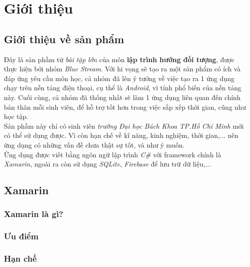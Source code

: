 \documentclass[a4paper]{article}
\begin{document}
\newpage
\tableofcontents
\newpage
\section{Giới thiệu}
\subsection{Giới thiệu về sản phẩm}
\hspace*{1 cm}Đây là sản phầm từ \textit{bài tập lớn} của môn \textbf{lập trình hướng đối tượng}, được thực hiện bởi nhóm \textit{Blue Stream}. Với hi vọng sẽ tạo ra một sản phẩm có ích và đáp ứng yêu cầu môn học, cả nhóm đã lên ý tưởng về việc tạo ra 1 ứng dụng chạy trên nền tảng điện thoại, cụ thể là \textit{Android}, vì tính phổ biến của nền tảng này. Cuối cùng, cả nhóm đã thống nhất sẽ làm 1 ứng dụng liên quan đến chính bản thân mỗi sinh viên, để hỗ trợ tốt hơn trong việc sắp xếp thời gian, cũng như học tập.\\
\hspace*{1 cm} Sản phầm này chỉ có sinh viên \textit{trường Đại học Bách Khoa TP.Hồ Chí Minh} mới có thể sử dụng được. Vì còn hạn chế về kĩ năng, kinh nghiệm, thời gian,... nên ứng dụng có những vấn đề chưa thật sự tốt, và như ý muốn.\\
\hspace*{1 cm}Ứng dụng được viết bằng ngôn ngữ lập trình \textit{C\#} với framework chính là \textit{Xamarin}, ngoài ra còn sử dụng \textit{SQLite}, \textit{Firebase} để lưu trữ dữ liệu,...
\subsection{Xamarin}
\subsubsection{Xamarin là gì?}
\subsubsection{Ưu điểm}
\subsubsection{Hạn chế}
\newpage
\end{document}
